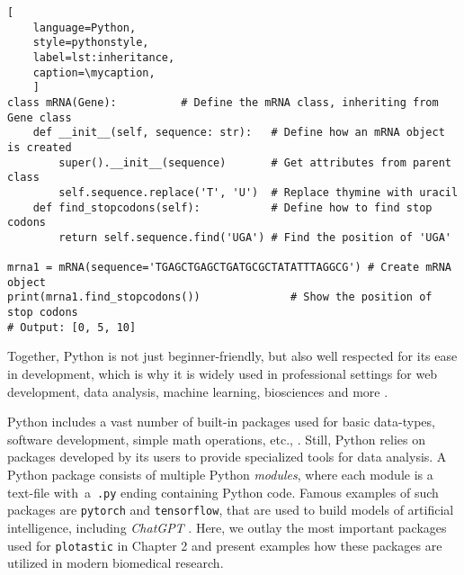 \def\mycaption{ Example of inheritance in Python.
    The class ``\texttt{mRNA}'' inherits from the class ``\texttt{Gene}''. The class
    ``\texttt{mRNA}'' has two methods, ``\texttt{\_\_init\_\_}'' and
    ``\texttt{find\_stopcodon}''. The method ``\texttt{find\_stopcodon}'' finds the
    position of stop codons. }
\begin{lstlisting}[
    language=Python,
    style=pythonstyle,
    label=lst:inheritance,
    caption=\mycaption,
    ]
class mRNA(Gene):          # Define the mRNA class, inheriting from Gene class
    def __init__(self, sequence: str):   # Define how an mRNA object is created
        super().__init__(sequence)       # Get attributes from parent class
        self.sequence.replace('T', 'U')  # Replace thymine with uracil
    def find_stopcodons(self):           # Define how to find stop codons
        return self.sequence.find('UGA') # Find the position of 'UGA'

mrna1 = mRNA(sequence='TGAGCTGAGCTGATGCGCTATATTTAGGCG') # Create mRNA object
print(mrna1.find_stopcodons())              # Show the position of stop codons
# Output: [0, 5, 10]
\end{lstlisting}


Together, Python is not just beginner-friendly, but also well respected for its
ease in development, which is why it is widely used in professional settings for
web development, data analysis, machine learning, biosciences and more
\cite{ekmekciIntroductionProgrammingBioscientists2016,rayhanRisePythonSurvey2023}.

%
\label{sec:intro_python_packages}%
Python includes a vast number of built-in packages used for basic data-types,
software development, simple math operations, etc.,
\cite{PythonLanguageReference2024}. Still, Python relies on packages developed
by its users to provide specialized tools for data analysis. A Python package
consists of multiple Python \emph{modules}, where each module is a text-file
with~a~\texttt{.py} ending containing Python code. Famous examples of such
packages are \texttt{pytorch} and \texttt{tensorflow}, that are used to build
models of artificial intelligence, including \textit{ChatGPT}
\cite{paszkePyTorchImperativeStyle2019, abadiTensorFlowLargeScaleMachine2016,
    radfordLanguageModelsAre2019}. Here, we outlay the most important packages used
for \texttt{plotastic} in Chapter 2 and present examples how these packages are
utilized in modern biomedical research.

